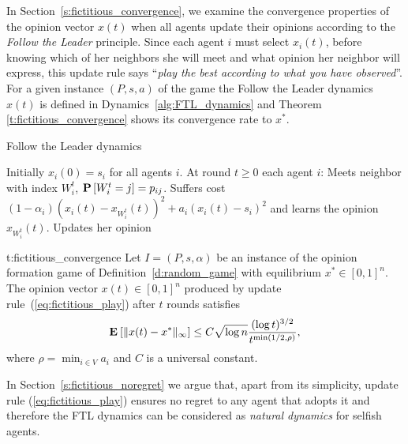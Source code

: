 In Section~\ref{s:fictitious_convergence}, we examine the convergence properties
of the opinion vector $x(t)$ when all agents update their opinions
according to the \emph{Follow the Leader} principle.
Since each agent $i$ must select $x_i(t)$, before knowing which of her neighbors
she will meet and what opinion her neighbor will express, this update rule
says \enquote{\emph{play the best according to what you have observed}}.
For a given instance $(P,s,a)$ of the game %
the Follow the Leader dynamics $x(t)$ is defined in Dynamics~\ref{alg:FTL_dynamics} and
Theorem \ref{t:fictitious_convergence} shows its convergence rate to $x^*$.
%
\begin{algorithm}
  \caption{Follow the Leader dynamics}
  \label{alg:FTL_dynamics}
  \begin{algorithmic}[1]
    \STATE Initially $x_i(0) = s_i$ for all agents $i$.
    \STATE At round $t\geq 0$ each agent $i$:
    \bindent
    \STATE Meets neighbor with index $W_i^t$, $\bm{\mathrm{P}}\left[W_i^t=j\right]=p_{ij}$.
    \STATE Suffers cost \((1-\alpha_i) (x_i(t) - x_{W_i^t}(t))^2 + a_i (x_i(t) - s_i)^2\)
    and learns the opinion $x_{W_i^t}(t)$.
  \STATE Updates her opinion
    \eindent
  \end{algorithmic}
\end{algorithm}
%

%
\begin{reptheorem}{t:fictitious_convergence}
  Let $I = (P,s, \alpha)$ be an instance of the opinion formation
  game of Definition~\ref{d:random_game} with equilibrium
  $x^* \in [0,1]^n$.  The opinion vector $x(t)\in[0,1]^n$ produced by
  update rule~(\ref{eq:fictitious_play}) after $t$ rounds satisfies
  \[
    \bm{\mathrm{E}}_{} \left[ \| x(t) - x^* \|_{\infty} \right] \leq
    C \sqrt{\log n}\frac{(\log t)^{3/2}}{t^{\min(1/2,\rho)}},
  \]
  where $\rho = \min_{i \in V} a_i$ and $C$ is a universal constant.
\end{reptheorem}


In Section~\ref{s:fictitious_noregret} we argue that,
apart from its simplicity, update rule (\ref{eq:fictitious_play}) ensures
no regret to any agent that adopts it and therefore the FTL dynamics
can be considered as \emph{natural dynamics} for selfish agents.

